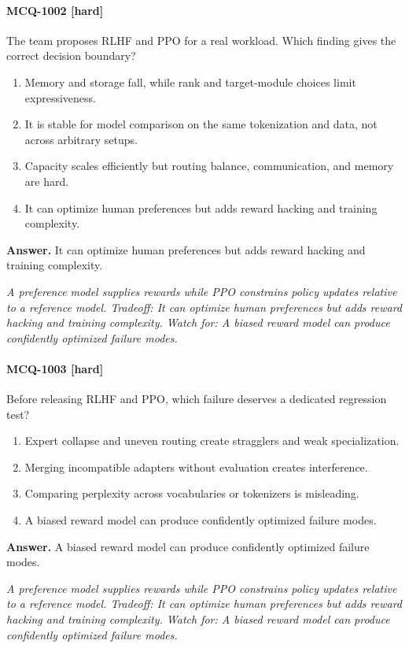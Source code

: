 \paragraph{MCQ-1002 [hard]} The team proposes RLHF and PPO for a real workload. Which finding gives the correct decision boundary?
\begin{enumerate}[label=\Alph*.]
\item Memory and storage fall, while rank and target-module choices limit expressiveness.
\item It is stable for model comparison on the same tokenization and data, not across arbitrary setups.
\item Capacity scales efficiently but routing balance, communication, and memory are hard.
\item It can optimize human preferences but adds reward hacking and training complexity.
\end{enumerate}
\noindent\textbf{Answer.} It can optimize human preferences but adds reward hacking and training complexity.
\par\textit{A preference model supplies rewards while PPO constrains policy updates relative to a reference model. Tradeoff: It can optimize human preferences but adds reward hacking and training complexity. Watch for: A biased reward model can produce confidently optimized failure modes.}
\paragraph{MCQ-1003 [hard]} Before releasing RLHF and PPO, which failure deserves a dedicated regression test?
\begin{enumerate}[label=\Alph*.]
\item Expert collapse and uneven routing create stragglers and weak specialization.
\item Merging incompatible adapters without evaluation creates interference.
\item Comparing perplexity across vocabularies or tokenizers is misleading.
\item A biased reward model can produce confidently optimized failure modes.
\end{enumerate}
\noindent\textbf{Answer.} A biased reward model can produce confidently optimized failure modes.
\par\textit{A preference model supplies rewards while PPO constrains policy updates relative to a reference model. Tradeoff: It can optimize human preferences but adds reward hacking and training complexity. Watch for: A biased reward model can produce confidently optimized failure modes.}

